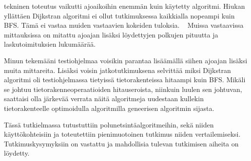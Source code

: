 tekninen toteutus vaikutti ajoaikoihin enemmän kuin käytetty algoritmi. 
Hiukan yllättäen Dijkstran algoritmi ei ollut tutkimuksessa kaikkialla 
nopeampi kuin BFS. Tämä ei vastaa muiden vastaavien kokeiden tuloksia.
~\cite{mazeGameTrilogi} Muissa vastaavissa mittauksissa on mitattu ajoajan 
lisäksi löydettyjen polkujen pituutta ja laskutoimituksien lukumäärää.
~\cite{mazeGameTrilogi}\cite{pPacman} \par
	Minun tekemääni testiohjelmaa voisikin parantaa lisäämällä siihen 
ajoajan lisäksi muita mittareita. Lisäksi voisin jatkotutkimuksena selvittää 
miksi Dijkstran algoritmi oli testiohjelmassa tietyissä tietorakenteissa 
hitaampi kuin BFS. Mikäli se johtuu tietorakenneoperaatioiden hitauseroista, 
niinkuin luulen sen johtuvan, saattaisi olla järkevää verrata näitä 
algoritmeja uudestaan kullekin tietorakenteelle optimoidulla algoritmilla 
geneerisen algoritmin sijasta. \par
	Tässä tutkielmassa tutustuttiin polunetsintäalgoritmeihin, sekä 
niiden käyttö\-koh\-teisiin ja toteutettiin pienimuotoinen tutkimus niiden 
vertailemiseksi. Tut\-ki\-mus\-ky\-sy\-myk\-siin on vastattu ja mahdollisia 
tulevan tutkimisen aiheita on löydetty.
